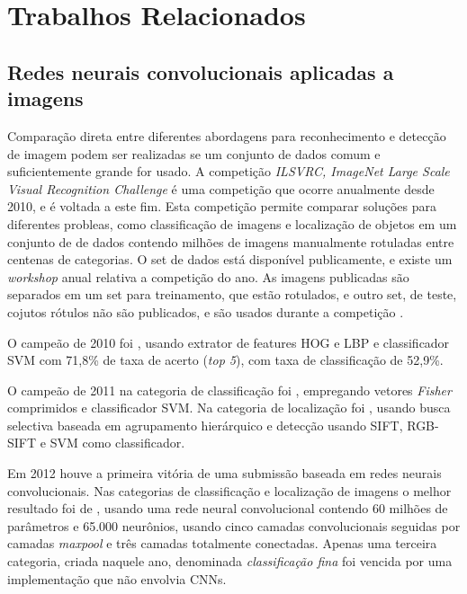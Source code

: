 
\chapter{Trabalhos Relacionados}

\section{Redes neurais convolucionais aplicadas a imagens}

Comparação direta entre diferentes abordagens para reconhecimento e detecção de
imagem podem ser realizadas se um conjunto de dados comum e suficientemente
grande for usado. A competição \emph{ILSVRC, ImageNet Large Scale Visual
Recognition Challenge} é uma competição que ocorre anualmente desde 2010, e é
voltada a este fim. Esta competição permite comparar soluções 
para diferentes probleas, como classificação de imagens e localização de
objetos em um conjunto de
de dados contendo milhões de imagens manualmente rotuladas entre centenas de
categorias. O set de dados está disponível publicamente, e existe um
\emph{workshop} anual relativa a competição do ano. As imagens publicadas são
separados em um set para treinamento, que estão rotulados, e outro set, de
teste, cojutos rótulos não são publicados, e são usados durante a competição
\cite{ILSVRC15}.

O campeão de 2010 foi \cite{lin2010imagenet}, usando extrator de features
HOG e LBP e classificador SVM com 71,8\% de taxa de acerto (\emph{top 5}),
com taxa de classificação de 52,9\%.

O campeão de 2011 na categoria de classificação foi
\cite{perronnin2010large}, empregando vetores
\emph{Fisher} comprimidos e classificador SVM. Na categoria de localização foi
\cite{van2011segmentation}, usando busca selectiva baseada em agrupamento
hierárquico e detecção usando SIFT, RGB-SIFT e SVM como classificador.

Em 2012 houve a primeira vitória de uma submissão baseada em redes neurais
convolucionais. Nas categorias de classificação e localização de imagens o
melhor resultado foi
de \cite{krizhevsky2012imagenet}, usando uma rede neural convolucional contendo
60 milhões de parâmetros e 65.000 neurônios, usando cinco camadas
convolucionais seguidas por camadas \emph{maxpool} e três camadas totalmente
conectadas. Apenas uma terceira categoria, criada naquele ano, denominada
\emph{classificação fina} foi vencida por uma implementação que não envolvia
CNNs.

